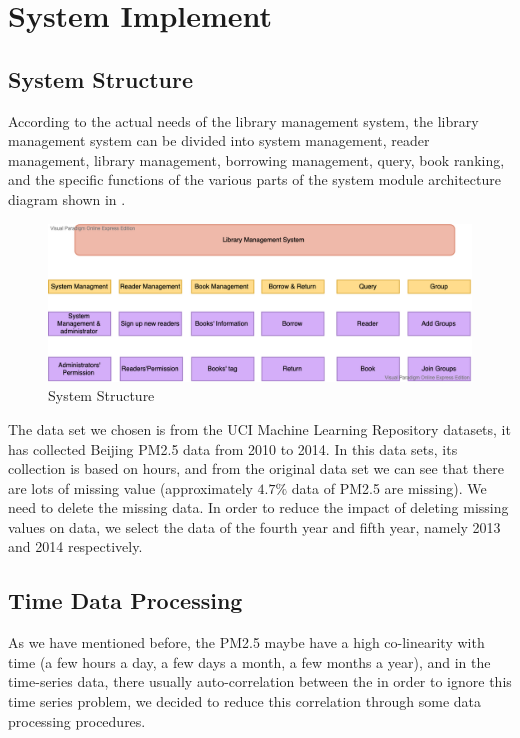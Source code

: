 
\chapter{System Implement} %

\label{Chapter2} %

\section{System Structure}

According to the actual needs of the library management system, the library management system can be divided into system management, reader management, library management, borrowing management, query, book ranking, and the specific functions of the various parts of the system module architecture diagram shown in  .

\begin{figure}[htbp!]
\centering
\includegraphics[width=1.0\textwidth]{Figures/structure.png}
\caption[Figures/origindata.png]{System Structure}
\label{fig:System Structure}
\end{figure}



The data set we chosen is from the UCI Machine Learning Repository datasets, it has collected Beijing PM2.5 data from 2010 to 2014. In this data sets, its collection is based on hours, and from the original data set we can see that there are lots of missing value (approximately $4.7\%$ data of PM2.5 are missing). We need to delete the missing data. In order to reduce the impact of deleting missing values on data, we select the data of the fourth year and fifth year, namely 2013 and 2014 respectively.


\section{Time Data Processing}
As we have mentioned before, the PM2.5 maybe have a high co-linearity with time (a few hours a day, a few days a month, a few months a year), and in the time-series data, there usually auto-correlation between the  in order to ignore this time series problem, we decided to reduce this correlation through some data processing procedures.


